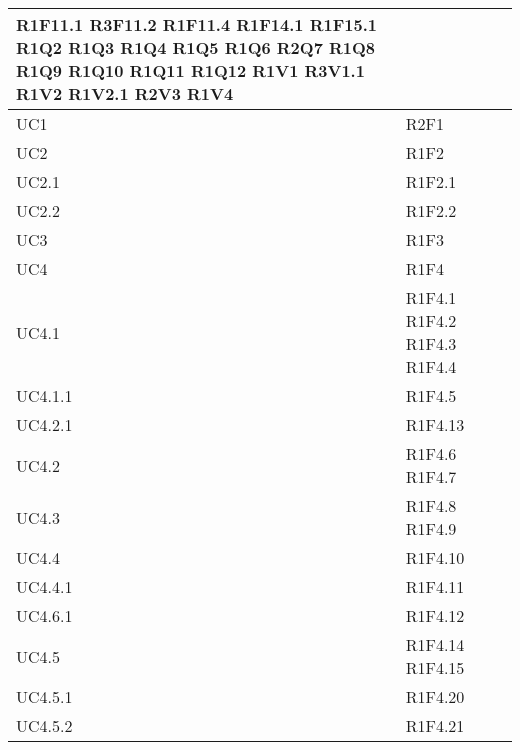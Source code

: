 \begin{center}
\begin{longtable}{|p{44mm}|p{22mm}|}
	R1F11.1\newline
	R3F11.2\newline
	R1F11.4\newline
	R1F14.1\newline
	R1F15.1	\newline
	R1Q2  \newline
	R1Q3  \newline
	R1Q4   \newline	
	R1Q5  \newline
	R1Q6  \newline
	R2Q7  \newline
	R1Q8  \newline
	R1Q9  \newline
	R1Q10   \newline	
	R1Q11 \newline
	R1Q12 \newline
	R1V1 \newline
	R3V1.1\newline
	R1V2 \newline
	R1V2.1\newline
	R2V3  \newline
	R1V4   
\\
\hline
UC1 & R2F1  \\
\hline
UC2 & R1F2  \\
\hline
UC2.1 & R1F2.1  \\
\hline
UC2.2 & R1F2.2  \\
\hline
UC3 & R1F3  \\
\hline
UC4& R1F4 \\
\hline
UC4.1& 
	R1F4.1  \newline
	R1F4.2 \newline
	R1F4.3 \newline
	R1F4.4 
 \\
\hline
UC4.1.1& R1F4.5 \\
\hline
UC4.2.1& R1F4.13\\
\hline
UC4.2& 
	R1F4.6  \newline
	R1F4.7 
   \\
\hline
UC4.3& 
	R1F4.8  \newline
	R1F4.9 
   \\
\hline
UC4.4& R1F4.10\\
\hline
UC4.4.1& R1F4.11 \\
\hline
UC4.6.1& R1F4.12 \\
\hline

UC4.5&  
R1F4.14  \newline
R1F4.15  	
  \\ \hline
UC4.5.1 & R1F4.20  \\
\hline
UC4.5.2 & R1F4.21 \\
\hline


\end{longtable}
\end{center}
